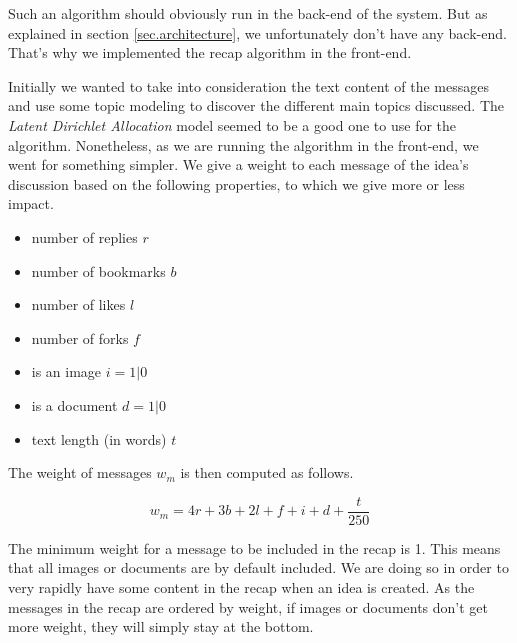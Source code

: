 \documentclass[a4paper,12pt, oneside]{article}
\begin{document}
Such an algorithm should obviously run in the back-end of the system.
But as explained in section \ref{sec.architecture}, we unfortunately don't have any back-end.
That's why we implemented the recap algorithm in the front-end.

Initially we wanted to take into consideration the text content of the messages and use some topic modeling to discover the different main topics discussed.
The \emph{Latent Dirichlet Allocation} \cite{blei2003latent} model seemed to be a good one to use for the algorithm.
Nonetheless, as we are running the algorithm in the front-end, we went for something simpler.
We give a weight to each message of the idea's discussion based on the following properties, to which we give more or less impact.

\begin{multicols}{2}
    \begin{itemize}
        \item number of replies $r$
        \item number of bookmarks $b$
        \item number of likes $l$
        \item number of forks $f$
        \item is an image $i = 1 | 0$
        \item is a document $d = 1 | 0$
        \item text length (in words) $t$
    \end{itemize}
\end{multicols}

The weight of messages $w_m$ is then computed as follows.

\begin{equation}
    \label{eq.messageWeightInRecap}
    w_m = 4r + 3b + 2l + f + i + d + \frac{t}{250}
\end{equation}

The minimum weight for a message to be included in the recap is 1.
This means that all images or documents are by default included.
We are doing so in order to very rapidly have some content in the recap when an idea is created.
As the messages in the recap are ordered by weight, if images or documents don't get more weight, they will simply stay at the bottom.
\end{document}

